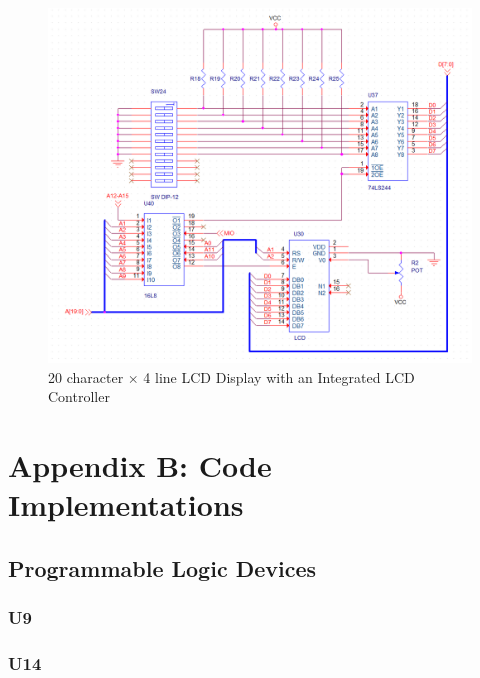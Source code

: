         \begin{figure}[ht]
            \begin{center}
                \includegraphics[width=1\textwidth]{figures/schematics/lcd.png}
                \caption{20 character $\times$ 4 line LCD Display with an Integrated LCD Controller} \label{fig:page11}
            \end{center}
        \end{figure}


    \clearpage
    \newpage

    \section{Appendix B: Code Implementations} \label{appendix:code}

        \subsection{Programmable Logic Devices}

            \subsubsection{U9}


            \newpage
            \subsubsection{U14}

